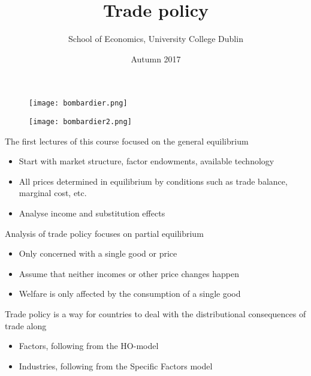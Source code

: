 \documentclass{beamer}
\title{Trade policy}
\author{School of Economics, University College Dublin}
\date{Autumn 2017}
\begin{document}
\begin{frame}
\titlepage  
\end{frame}

\begin{frame}
  \begin{figure}
    \texttt{[image: bombardier.png]}
  \end{figure}
\end{frame}

\begin{frame}
  \begin{figure}
    \texttt{[image: bombardier2.png]}
  \end{figure}
\end{frame}

\begin{frame}
  The first lectures of this course focused on the general equilibrium
  \begin{itemize}
    \item Start with market structure, factor endowments, available technology
    \item All prices determined in equilibrium by conditions such as trade balance, marginal cost, etc.
    \item Analyse income and substitution effects
  \end{itemize}
  \medskip
  Analysis of trade policy focuses on partial equilibrium
  \begin{itemize}
    \item Only concerned with a single good or price
    \item Assume that neither incomes or other price changes happen
    \item Welfare is only affected by the consumption of a single good
  \end{itemize}
\end{frame}

\begin{frame}
 Trade policy is a way for countries to deal with the distributional consequences of trade along
 \begin{itemize}
   \item Factors, following from the HO-model
   \item Industries, following from the Specific Factors model
 \end{itemize}
\end{frame}
\end{document}
